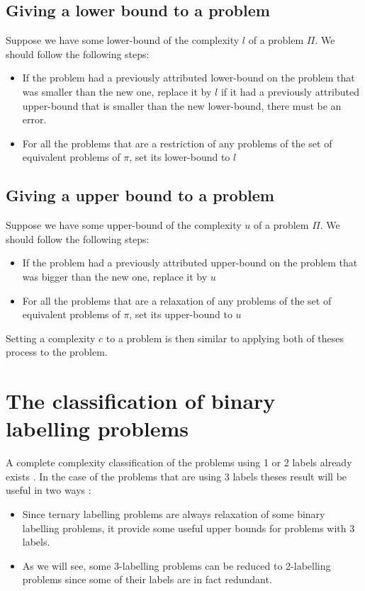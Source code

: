 \subsection{Giving a lower bound to a problem}
Suppose we have some lower-bound of the complexity $l$ of a problem $\Pi$. We should follow the following steps:
\begin{itemize}
    \item If the problem had a previously attributed lower-bound on the problem that was smaller than the new one, replace it by $l$ if it had a previously attributed upper-bound that is smaller than the new lower-bound, there must be an error.
    \item For all the problems that are a restriction of any problems of the set of equivalent problems of $\pi$, set its lower-bound to $l$
\end{itemize}
\subsection{Giving a upper bound to a problem}
Suppose we have some upper-bound of the complexity $u$ of a problem $\Pi$. We should follow the following steps:
\begin{itemize}
    \item If the problem had a previously attributed upper-bound on the problem that was bigger than the new one, replace it by $u$
    \item For all the problems that are a relaxation of any problems of the set of equivalent problems of $\pi$, set its upper-bound to $u$
\end{itemize}
Setting a complexity $c$ to a problem is then similar to applying both of theses process to the problem.


\section{The classification of binary labelling problems}\label{sec:BLP}
A complete complexity classification of the problems using 1 or 2 labels already exists \cite{1}. In the case of the problems that are using 3 labels theses result will be useful in two ways :
\begin{itemize}
    \item Since ternary labelling problems are always relaxation of some binary labelling problems, it provide some useful upper bounds for problems with 3 labels.
    \item As we will see, some 3-labelling problems can be reduced to 2-labelling problems since some of their labels are in fact redundant.
\end{itemize}
